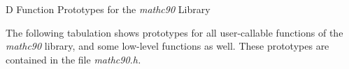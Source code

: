 \documentclass[twoside]{MATH77}
\begin{document}
\begapp D Function Prototypes for the {\em mathc90} Library

{\normalsize The following tabulation shows prototypes for all user-callable
functions of the {\em mathc90} library, and some low-level functions as well.
These prototypes are contained in the file {\em mathc90.h.}}

\tablehead{}
\tabletail{}
\begin{supertabular}{ll}

\end{supertabular}
\end{document}

